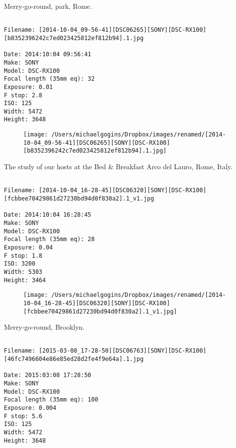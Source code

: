 \clearpage
\onecolumn
\noindent Merry-go-round, park, Rome.
\noindent
\begin{lstlisting}

Filename: [2014-10-04_09-56-41][DSC06265][SONY][DSC-RX100][b8352396242c7ed023425812ef812b94].1.jpg

Date: 2014:10:04 09:56:41
Make: SONY
Model: DSC-RX100
Focal length (35mm eq): 32
Exposure: 0.01
F stop: 2.8
ISO: 125
Width: 5472
Height: 3648
\end{lstlisting}
\clearpage

\begin{figure}
\texttt{[image: /Users/michaelgogins/Dropbox/images/renamed/[2014-10-04\_09-56-41][DSC06265][SONY][DSC-RX100][b8352396242c7ed023425812ef812b94].1.jpg]}
\end{figure}
    
\clearpage
\onecolumn
\noindent The study of our hosts at the Bed & Breakfast Arco del Lauro, Rome, Italy.
\noindent
\begin{lstlisting}

Filename: [2014-10-04_16-28-45][DSC06320][SONY][DSC-RX100][fcbbee70429861d27230bd94d0f830a2].1_v1.jpg

Date: 2014:10:04 16:28:45
Make: SONY
Model: DSC-RX100
Focal length (35mm eq): 28
Exposure: 0.04
F stop: 1.8
ISO: 3200
Width: 5303
Height: 3464
\end{lstlisting}
\clearpage

\begin{figure}
\texttt{[image: /Users/michaelgogins/Dropbox/images/renamed/[2014-10-04\_16-28-45][DSC06320][SONY][DSC-RX100][fcbbee70429861d27230bd94d0f830a2].1\_v1.jpg]}
\end{figure}
    
\clearpage
\onecolumn
\noindent Merry-go-round, Brooklyn.
\noindent
\begin{lstlisting}

Filename: [2015-03-08_17-28-50][DSC06763][SONY][DSC-RX100][46fc7496604e86e85ed28d2fe4f9e64a].1.jpg

Date: 2015:03:08 17:28:50
Make: SONY
Model: DSC-RX100
Focal length (35mm eq): 100
Exposure: 0.004
F stop: 5.6
ISO: 125
Width: 5472
Height: 3648
\end{lstlisting}
\clearpage

